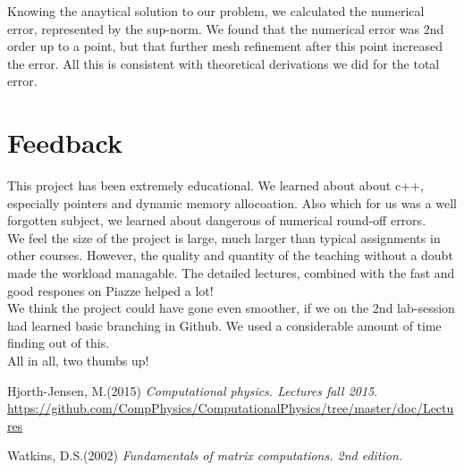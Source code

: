 \documentclass{article}
\begin{document}
Knowing the anaytical solution to our problem, we calculated the numerical error, represented by the sup-norm. We found that the numerical error was 2nd order up to a point, but that further mesh refinement after this point increased the error. All this is consistent with theoretical derivations we did for the total error. 

\section{Feedback}
This project has been extremely educational. We learned about about c++, especially pointers and dynamic memory allocoation. Also which for us was a well forgotten subject, we learned about dangerous of numerical round-off errors. \\

We feel the size of the project is large, much larger than typical assignments in other courses. However, the quality and quantity of the teaching without a doubt made the workload managable. The detailed lectures, combined with the fast and good respones on Piazze helped a lot!\\

We think the project could have gone even smoother, if we on the 2nd lab-session had learned basic branching in Github. We used a considerable amount of time finding out of this.\\

All in all, two thumbs up!

\pagebreak
\begin{thebibliography}{9}
	Hjorth-Jensen, M.(2015)
	\textit{Computational physics. Lectures fall 2015}. 
	\url{https://github.com/CompPhysics/ComputationalPhysics/tree/master/doc/Lectures}
	
	Watkins, D.S.(2002)
	\textit{Fundamentals of matrix computations. 2nd edition.}

\end{thebibliography}
\end{document}
